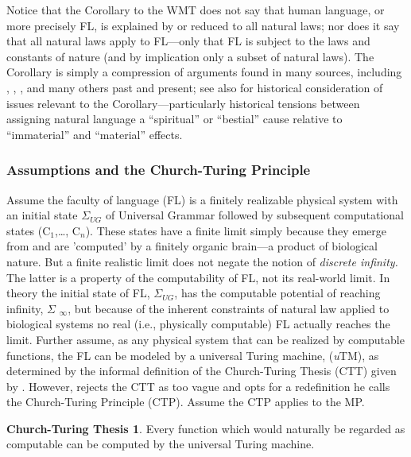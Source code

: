 \documentclass[11pt,twoside]{article}
\theoremstyle{plain}
\numberwithin{equation}{section}
\theoremstyle{definition}
\newtheorem{phrase string}{Phrase String}
\begin{document}
Notice that the Corollary to the WMT does not say that human language, or more precisely FL, is explained by or reduced to all natural laws; nor does it say that all natural laws apply to FL---only that FL is subject to the laws and constants of nature (and by implication only a subset of natural laws). The Corollary is simply a compression of arguments found in many sources, including \cite{boeckxpp:2005}, \cite{chomsky86knowledge,chomsky95langnature,chomsky95mp}, \cite{ppuriagereka:2008}, \cite{uriagereka:1998} and many others past and present; see also \cite{formigari:2004} for historical consideration of issues relevant to the Corollary---particularly historical tensions between assigning natural language a ``spiritual'' or ``bestial'' cause relative to ``immaterial'' and ``material'' effects.

\subsubsection{Assumptions and the Church-Turing Principle} 
Assume the faculty of language (FL) is a finitely realizable physical system with an initial state $\Sigma_{UG}$ of Universal Grammar followed by subsequent computational states (C$_{1}$,\ldots, C$_{n}$). These states have a finite limit simply because they emerge from and are 'computed' by a finitely organic brain---a product of biological nature. But a finite realistic limit does not negate the notion of \textsl{discrete infinity.} The latter is a property of the computability of FL, not its real-world limit. In theory the initial state of FL, $\Sigma_{UG}$, has the computable potential of reaching infinity, $\Sigma$ $_{\infty}$, but because of the inherent constraints of natural law applied to biological systems no real (i.e., physically computable) FL actually reaches the limit. Further assume, as any physical system that can be realized by computable functions, the FL can be modeled by a universal Turing machine, (\textsl{u}TM), as determined by the informal definition of the Church-Turing Thesis (CTT) given by \cite{deutsch:1985}. However, \cite{deutsch:1985} rejects the CTT as too vague and opts for a redefinition he calls the Church-Turing Principle (CTP). Assume the CTP applies to the MP.

\newtheorem*{ctthesis}{Church-Turing Thesis}
\begin{ctthesis}
Every function which would naturally be regarded as computable can be computed by the universal Turing machine.
\end{ctthesis}
\end{document}
